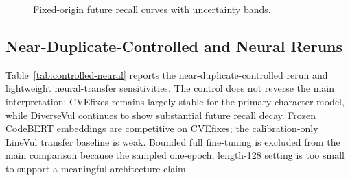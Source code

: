 \documentclass[a4paper,fleqn]{cas-dc}
\begin{document}
\begin{figure}
  \caption{Fixed-origin future recall curves with uncertainty bands.}
  \label{fig:aging}
\end{figure}

\subsection{Near-Duplicate-Controlled and Neural Reruns}

Table~\ref{tab:controlled-neural} reports the near-duplicate-controlled rerun
and lightweight neural-transfer sensitivities. The control does not reverse the
main interpretation: CVEfixes remains largely stable for the primary character
model, while DiverseVul continues to show substantial future recall decay.
Frozen CodeBERT embeddings are competitive on CVEfixes; the calibration-only
LineVul transfer baseline is weak. Bounded full fine-tuning is excluded from
the main comparison because the sampled one-epoch, length-128 setting is too
small to support a meaningful architecture claim.

\begin{table}
\centering
\caption{Near-duplicate-controlled temporal sensitivity and lightweight
neural-transfer baselines.}
\label{tab:controlled-neural}
\end{table}
\end{document}
